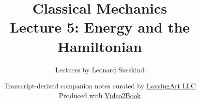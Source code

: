 \documentclass[11pt,oneside]{book}
\begin{document}
\hypersetup{pageanchor=false}
\frontmatter
\title{Classical Mechanics\\[0.45em]
\large Lecture 5: Energy and the Hamiltonian}
\author{Lectures by Leonard Susskind}
\date{Transcript-derived companion notes curated by
\href{https://lazying.art}{LazyingArt LLC}\\[0.35em]
\small Produced with
\href{https://github.com/lachlanchen/Video2Book}{Video2Book}}
\maketitle
\hypersetup{pageanchor=true}
\mainmatter

\end{document}
